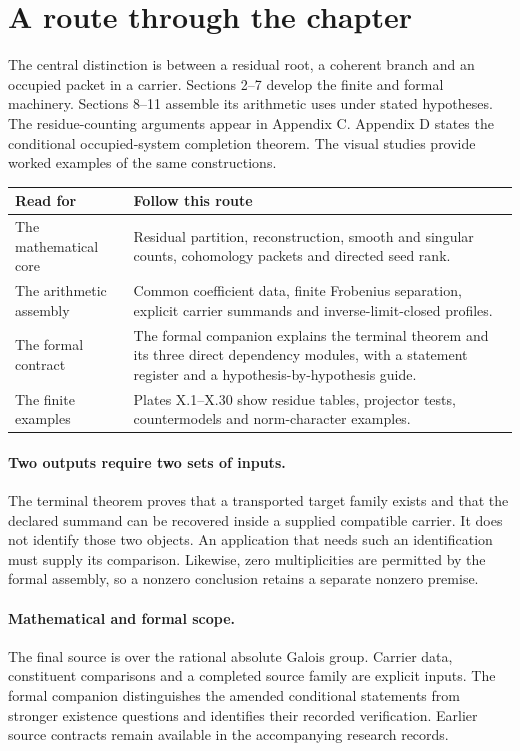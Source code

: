 \section*{A route through the chapter}
The central distinction is between a residual root, a coherent branch and an
occupied packet in a carrier. Sections 2--7 develop the finite and formal
machinery. Sections 8--11 assemble its arithmetic uses under stated hypotheses.
The residue-counting arguments appear in Appendix C. Appendix D states the
conditional occupied-system completion theorem. The visual studies provide
worked examples of the same constructions.

\begin{tabularx}{\linewidth}{@{}p{.24\linewidth}X@{}}\toprule
Read for & Follow this route\\\midrule
The mathematical core & Residual partition, reconstruction, smooth and singular counts, cohomology packets and directed seed rank.\\
The arithmetic assembly & Common coefficient data, finite Frobenius separation, explicit carrier summands and inverse-limit-closed profiles.\\
The formal contract & The formal companion explains the terminal theorem and its three direct dependency modules, with a statement register and a hypothesis-by-hypothesis guide.\\
The finite examples & Plates X.1--X.30 show residue tables, projector tests, countermodels and norm-character examples.\\\bottomrule
\end{tabularx}

\paragraph{Two outputs require two sets of inputs.}
The terminal theorem proves that a transported target family exists and that the
declared summand can be recovered inside a supplied compatible carrier. It does
not identify those two objects. An application that needs such an identification
must supply its comparison. Likewise, zero multiplicities are permitted by the
formal assembly, so a nonzero conclusion retains a separate nonzero premise.

\paragraph{Mathematical and formal scope.}
The final source is over the rational absolute Galois group. Carrier data,
constituent comparisons and a completed source family are explicit inputs.
The formal companion distinguishes the amended conditional statements from
stronger existence questions and identifies their recorded verification.
Earlier source contracts remain available in the accompanying research records.
